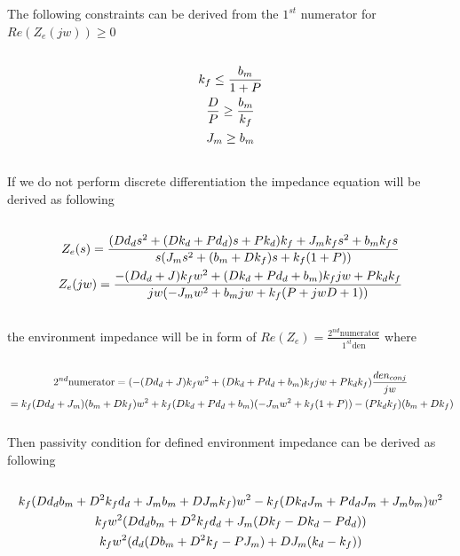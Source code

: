 \documentclass[a4paper,12pt]{article}
\begin{document}
The following constraints can be derived from the $1^{st}$ numerator for $Re(Z_e(jw))\geq 0$
\begin{equation}
\begin{multlined}\\
k_f\leq\frac{b_m}{1+P}\\
\frac{D}{P}\geq \frac{b_m}{k_f} \\
J_m\geq b_m \\
\end{multlined}\\
\end{equation}
If we do not perform discrete differentiation the impedance equation will be derived as following
\begin{equation}
\begin{multlined}\\
Z_{e}(s)=\frac{(Dd_ds^2+(Dk_d+Pd_d)s+Pk_d)k_f+J_mk_fs^2+b_mk_fs}{s(J_ms^2+(b_m+Dk_f)s+k_f(1+P))} \\
Z_{e}(jw)=\frac{-(Dd_d+J)k_fw^2+(Dk_d+Pd_d+b_m)k_fjw+Pk_dk_f}{jw(-J_mw^2+b_mjw+k_f(P+jwD+1))} \\
\end{multlined}\\
\end{equation}
the environment impedance will be in form of $Re(Z_{e})=\frac{2^{nd} \mathrm{numerator}}{1^{st}\mathrm{den}}$ where\\
\begin{equation}
\begin{multlined}\\
2^{nd} \mathrm{numerator}=(-(Dd_d+J)k_fw^2+(Dk_d+Pd_d+b_m)k_fjw+Pk_dk_f)\frac{den_{conj}}{jw}  \\
=k_f(Dd_d+J_m)(b_m+Dk_f)w^2+k_f(Dk_d+Pd_d+b_m)(-J_mw^2+k_f(1+P))-(Pk_dk_f)(b_m+Dk_f)\\
\end{multlined}\\
\end{equation}
Then passivity condition for defined environment impedance can be derived as following
\begin{equation}
\begin{multlined}\\
k_f(Dd_db_m+D^2k_fd_d+J_mb_m+DJ_mk_f)w^2-k_f(Dk_dJ_m+Pd_dJ_m+J_mb_m)w^2\\
k_fw^2(Dd_db_m+D^2k_fd_d+J_m(Dk_f-Dk_d-Pd_d))\\
k_fw^2(d_d(Db_m+D^2k_f-PJ_m)+DJ_m(k_d-k_f))\\
\end{multlined}\\
\end{equation}
\end{document}
